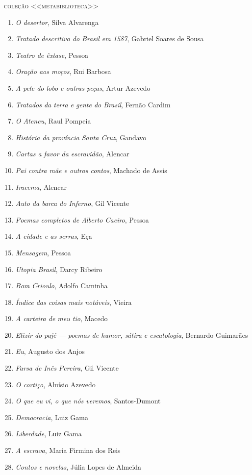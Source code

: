 {\large\textsc{coleção <<metabiblioteca>>}}\\

\begin{enumerate}
\setlength\parskip{4.2pt}
\setlength\itemsep{-1.4mm}
\item \textit{O desertor}, Silva Alvarenga
\item \textit{Tratado descritivo do Brasil em 1587}, Gabriel Soares de Sousa
\item \textit{Teatro de êxtase}, Pessoa
\item \textit{Oração aos moços}, Rui Barbosa
\item \textit{A pele do lobo e outras peças}, Artur Azevedo
\item \textit{Tratados da terra e gente do Brasil}, Fernão Cardim 
\item \textit{O Ateneu}, Raul Pompeia
\item \textit{História da província Santa Cruz}, Gandavo
\item \textit{Cartas a favor da escravidão}, Alencar
\item \textit{Pai contra mãe e outros contos}, Machado de Assis
\item \textit{Iracema}, Alencar
\item \textit{Auto da barca do Inferno}, Gil Vicente
\item \textit{Poemas completos de Alberto Caeiro}, Pessoa
\item \textit{A cidade e as serras}, Eça
\item \textit{Mensagem}, Pessoa
\item \textit{Utopia Brasil}, Darcy Ribeiro
\item \textit{Bom Crioulo}, Adolfo Caminha
\item \textit{Índice das coisas mais notáveis}, Vieira
\item \textit{A carteira de meu tio}, Macedo
\item \textit{Elixir do pajé --- poemas de humor, sátira e escatologia}, Bernardo Guimarães
\item \textit{Eu}, Augusto dos Anjos
\item \textit{Farsa de Inês Pereira}, Gil Vicente
\item \textit{O cortiço}, Aluísio Azevedo
\item \textit{O que eu vi, o que nós veremos}, Santos-Dumont
\item \textit{Democracia}, Luiz Gama
\item \textit{Liberdade}, Luiz Gama
\item \textit{A escrava}, Maria Firmina dos Reis
\item \textit{Contos e novelas}, Júlia Lopes de Almeida


\end{enumerate}\medskip

